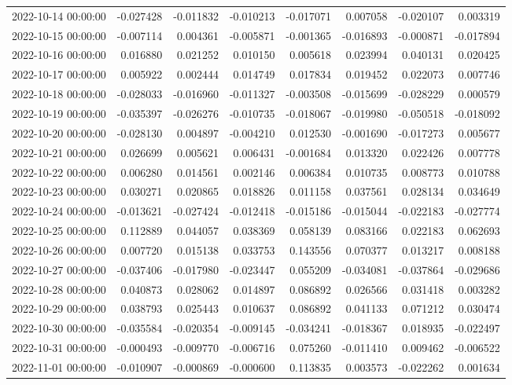 \begin{tabular}{lrrrrrrr}
2022-10-14 00:00:00 & -0.027428 & -0.011832 & -0.010213 & -0.017071 & 0.007058 & -0.020107 & 0.003319 \\
2022-10-15 00:00:00 & -0.007114 & 0.004361 & -0.005871 & -0.001365 & -0.016893 & -0.000871 & -0.017894 \\
2022-10-16 00:00:00 & 0.016880 & 0.021252 & 0.010150 & 0.005618 & 0.023994 & 0.040131 & 0.020425 \\
2022-10-17 00:00:00 & 0.005922 & 0.002444 & 0.014749 & 0.017834 & 0.019452 & 0.022073 & 0.007746 \\
2022-10-18 00:00:00 & -0.028033 & -0.016960 & -0.011327 & -0.003508 & -0.015699 & -0.028229 & 0.000579 \\
2022-10-19 00:00:00 & -0.035397 & -0.026276 & -0.010735 & -0.018067 & -0.019980 & -0.050518 & -0.018092 \\
2022-10-20 00:00:00 & -0.028130 & 0.004897 & -0.004210 & 0.012530 & -0.001690 & -0.017273 & 0.005677 \\
2022-10-21 00:00:00 & 0.026699 & 0.005621 & 0.006431 & -0.001684 & 0.013320 & 0.022426 & 0.007778 \\
2022-10-22 00:00:00 & 0.006280 & 0.014561 & 0.002146 & 0.006384 & 0.010735 & 0.008773 & 0.010788 \\
2022-10-23 00:00:00 & 0.030271 & 0.020865 & 0.018826 & 0.011158 & 0.037561 & 0.028134 & 0.034649 \\
2022-10-24 00:00:00 & -0.013621 & -0.027424 & -0.012418 & -0.015186 & -0.015044 & -0.022183 & -0.027774 \\
2022-10-25 00:00:00 & 0.112889 & 0.044057 & 0.038369 & 0.058139 & 0.083166 & 0.022183 & 0.062693 \\
2022-10-26 00:00:00 & 0.007720 & 0.015138 & 0.033753 & 0.143556 & 0.070377 & 0.013217 & 0.008188 \\
2022-10-27 00:00:00 & -0.037406 & -0.017980 & -0.023447 & 0.055209 & -0.034081 & -0.037864 & -0.029686 \\
2022-10-28 00:00:00 & 0.040873 & 0.028062 & 0.014897 & 0.086892 & 0.026566 & 0.031418 & 0.003282 \\
2022-10-29 00:00:00 & 0.038793 & 0.025443 & 0.010637 & 0.086892 & 0.041133 & 0.071212 & 0.030474 \\
2022-10-30 00:00:00 & -0.035584 & -0.020354 & -0.009145 & -0.034241 & -0.018367 & 0.018935 & -0.022497 \\
2022-10-31 00:00:00 & -0.000493 & -0.009770 & -0.006716 & 0.075260 & -0.011410 & 0.009462 & -0.006522 \\
2022-11-01 00:00:00 & -0.010907 & -0.000869 & -0.000600 & 0.113835 & 0.003573 & -0.022262 & 0.001634 \\

\end{tabular}
